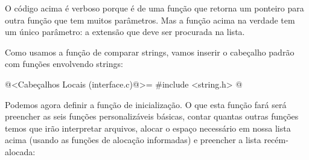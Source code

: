 O código acima é verboso porque é de uma função que retorna um
ponteiro para outra função que tem muitos parâmetros. Mas a função
acima na verdade tem um único parâmetro: a extensão que deve ser
procurada na lista.

Como usamos a função de comparar strings, vamos inserir o cabeçalho
padrão com funções envolvendo strings:

\iniciocodigo
@<Cabeçalhos Locais (interface.c)@>=
#include <string.h>
@
\fimcodigo

Podemos agora definir a função de inicialização. O que esta função
fará será preencher as seis funções personalizáveis básicas, contar
quantas outras funções temos que irão interpretar arquivos, alocar o
espaço necessário em nossa lista acima (usando as funções de alocação
informadas) e preencher a lista recém-alocada:

